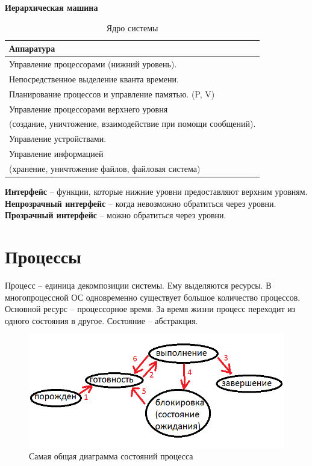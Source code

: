 \textbf{Иерархическая машина} \cite{IBM360}

\begin{table}[H]
\caption{Ядро системы}
\begin{tabular}{|l|}
\hline
Аппаратура\\
\hline
Управление процессорами (нижний уровень).\\
Непосредственное выделение кванта времени.\\
\hline
Планирование процессов и управление памятью. (P, V)\\
\hline
Управление процессорами верхнего уровня \\
(создание, уничтожение, взаимодействие при помощи сообщений).\\
\hline
Управление устройствами.\\
\hline
Управление информацией \\
(хранение, уничтожение файлов, файловая система)\\
\hline
\end{tabular}
\end{table}

\textbf{Интерфейс} – функции, которые нижние уровни предоставляют верхним уровням.
\textbf{Непрозрачный интерфейс} – когда невозможно обратиться через уровни.
\textbf{Прозрачный интерфейс} – можно обратиться через уровни.

\chapter{Процессы}

Процесс – единица декомпозиции системы. Ему выделяются ресурсы. В многопроцессной ОС одновременно существует большое количество процессов. Основной ресурс – процессорное время. За время жизни процесс переходит из одного состояния в другое. Состояние – абстракция.

\begin{figure}[H]
  \centering
  \includegraphics[width=\textwidth]{pic/2.png}
  \caption{Самая общая диаграмма состояний процесса}
  \label{pic:diag_proc}
\end{figure}

